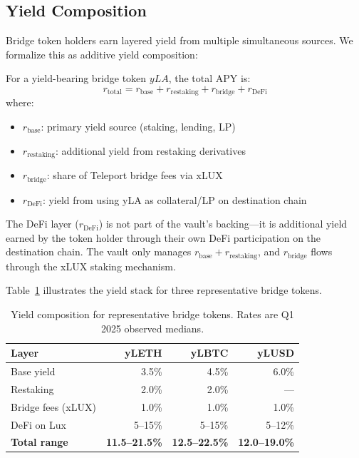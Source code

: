\subsection{Yield Composition}\label{sec:composition}

Bridge token holders earn layered yield from multiple simultaneous sources. We formalize this as additive yield composition:

\begin{definition}
For a yield-bearing bridge token $yLA$, the total APY is:
\begin{equation}\label{eq:yield_composition}
  r_{\text{total}} = r_{\text{base}} + r_{\text{restaking}} + r_{\text{bridge}} + r_{\text{DeFi}}
\end{equation}
where:
\begin{itemize}[nosep]
  \item $r_{\text{base}}$: primary yield source (staking, lending, LP)
  \item $r_{\text{restaking}}$: additional yield from restaking derivatives
  \item $r_{\text{bridge}}$: share of Teleport bridge fees via xLUX
  \item $r_{\text{DeFi}}$: yield from using yLA as collateral/LP on destination chain
\end{itemize}
\end{definition}

\begin{remark}
The DeFi layer ($r_{\text{DeFi}}$) is not part of the vault's backing---it is additional yield earned by the token holder through their own DeFi participation on the destination chain. The vault only manages $r_{\text{base}} + r_{\text{restaking}}$, and $r_{\text{bridge}}$ flows through the xLUX staking mechanism.
\end{remark}

Table~\ref{tab:yield_composition} illustrates the yield stack for three representative bridge tokens.

\begin{table}[h]
\centering
\small
\caption{Yield composition for representative bridge tokens. Rates are Q1 2025 observed medians.}
\label{tab:yield_composition}
\begin{tabular}{@{}lrrr@{}}
\toprule
\textbf{Layer} & \textbf{yLETH} & \textbf{yLBTC} & \textbf{yLUSD} \\
\midrule
Base yield & 3.5\% & 4.5\% & 6.0\% \\
Restaking & 2.0\% & 2.0\% & --- \\
Bridge fees (xLUX) & 1.0\% & 1.0\% & 1.0\% \\
DeFi on Lux & 5--15\% & 5--15\% & 5--12\% \\
\midrule
\textbf{Total range} & \textbf{11.5--21.5\%} & \textbf{12.5--22.5\%} & \textbf{12.0--19.0\%} \\
\bottomrule
\end{tabular}
\end{table}

